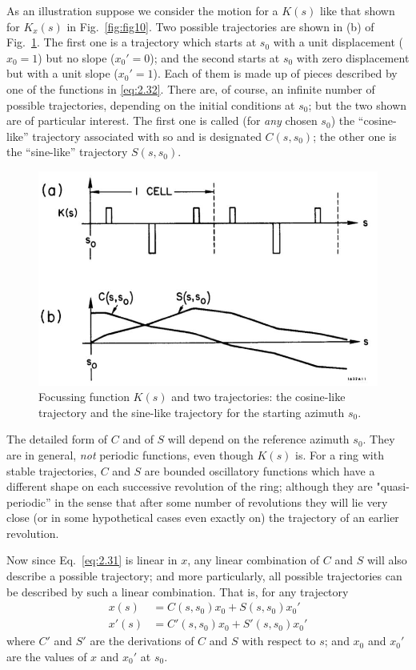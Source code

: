 As an illustration suppose we consider the motion for a $K(s)$ like that shown for $K_x(s)$ in Fig.~\ref{fig:fig10}. Two possible trajectories are shown in (b) of Fig.~\ref{fig:fig11}. The first one is a trajectory which starts at $s_0$ with a unit displacement ($x_0 = 1$) but no slope ($x_0' = 0$); and the second starts at $s_0$ with zero displacement but with a unit slope ($x_0' = 1$). Each of them is made up of pieces described by one of the functions in \eqref{eq:2.32}. There are, of course, an infinite number of possible trajectories, depending on the initial conditions at $s_0$; but the two shown are of particular interest. The first one is called (for \textit{any} chosen $s_0$) the “cosine-like” trajectory associated with so and is designated $C(s,s_0)$; the other one is the “sine-like” trajectory $S(s,s_0)$.

\begin{figure}[!htb]
	\centering
	\includegraphics[width=0.7\linewidth]{./Figuras/fig11.jpeg}
	\caption{Focussing function $K(s)$ and two trajectories: the cosine-like trajectory and the sine-like trajectory for the starting azimuth $s_0$.}
	\label{fig:fig11}
\end{figure}

The detailed form of $C$ and of $S$ will depend on the reference azimuth $s_0$. They are in general, \textit{not} periodic functions, even though $K(s)$ is. For a ring with stable trajectories, $C$ and $S$ are bounded oscillatory functions which have a different shape on each successive revolution of the ring; although they are "quasi-periodic” in the sense that after some number of revolutions they will lie very close (or in some hypothetical cases even exactly on) the trajectory of an earlier revolution.

Now since Eq.~\eqref{eq:2.31} is linear in $x$, any linear combination of $C$ and $S$ will also describe a possible trajectory; and more particularly, all possible trajectories can be described by such a linear combination. That is, for any trajectory
\begin{align}
	x(s) &= C(s,s_0)x_0 + S(s,s_0)x_0'\\
	x'(s) &= C'(s,s_0)x_0 + S'(s,s_0)x_0'
\end{align}
where $C'$ and $S'$ are the derivations of $C$ and $S$ with respect to $s$; and $x_0$ and $x_0'$ are the values of $x$ and $x_0'$ at $s_0$.

